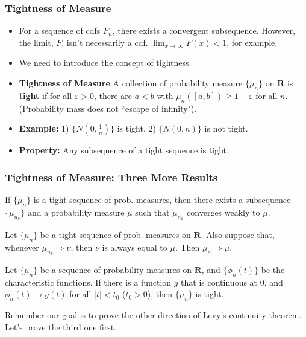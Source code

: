 \documentclass[handout]{beamer}
\begin{document}
\frame
{
 \frametitle{Tightness of Measure}

\begin{itemize}
\item<1-> For a sequence of cdfs $F_{n}$, there exists a convergent subsequence. However, the limit, $F$, isn't necessarily a cdf. $\lim_{x \to \infty} F(x) < 1$, for example. 

\item<2-> We need to introduce the concept of tightness.

\item<3-> \textbf{Tightness of Measure} A collection of probability measure $\{\mu_n\}$ on $\mathbf{R}$ is \textbf{tight} if for all $\varepsilon>0$, there are $a<b$ with $\mu_n([a,b]) \geq 1-\varepsilon$ for all $n$. (Probability mass does not ``escape of infinity").

\item<4-> \textbf{Example:} 1) $\{N(0, \frac{1}{n})\}$ is tight. 2) $\{N(0, n)\}$ is not tight.

\item<5-> \textbf{Property:} Any subsequence of a tight sequence is tight.  \end{itemize}
}


\frame
{
  \frametitle{Tightness of Measure: Three More Results }

\begin{theorem}[11.1.10]
 If $\{\mu_n\}$ is a tight sequence of prob. measures, then there exists a subsequence $\{\mu_{n_k}\}$ and a probability measure $\mu$ such that $\mu_{n_k}$ converges weakly to $\mu$. 
 \end{theorem}
 
\begin{theorem}[Corollary 11.1.11]
 Let $\{\mu_n\}$ be a tight sequence of prob. measures on $\mathbf{R}$. Also suppose that, whenever $\mu_{n_k} \Rightarrow \nu$, then $\nu$ is always equal to $\mu$. Then $\mu_n \Rightarrow \mu$.
 \end{theorem}

\begin{Lemma}[11.1.13]
 Let $\{\mu_n\}$ be a sequence of probability measures on $\mathbf{R}$, and $\{\phi_n(t)\}$ be the characteristic functions. If there is a function $g$ that is continuous at 0, and $\phi_n(t)\rightarrow g(t)$ for all $|t|<t_0$ ($t_0>0$), then $\{\mu_n\}$ is tight. 
 \end{Lemma}

Remember our goal is to prove the other direction of Levy's continuity theorem. Let's prove the third one first.

}
\end{document}
